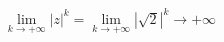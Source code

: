 \documentclass[preview]{standalone}
\begin{document}
\begin{align*}
\lim_{k \rightarrow +\infty}|z|^k = \lim_{k \rightarrow +\infty}|\sqrt{2}|^k \rightarrow +\infty
\end{align*}
\end{document}
